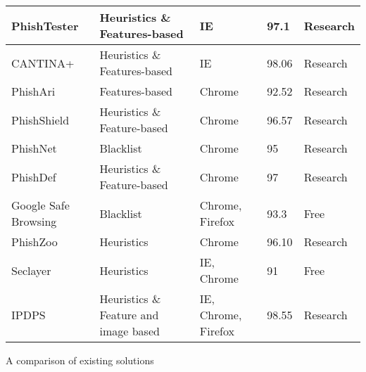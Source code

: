 \begin{singlespace}
\begin{center}
\begin{tabular}{ | m{8em} | m{13em} | m{8.5em} | m{2.3em} | m{5em} | }
            PhishTester                  & Heuristics \& Features-based          & IE                  & 97.1            & Research               \\
            \hline
            CANTINA+                     & Heuristics \& Features-based          & IE                  & 98.06           & Research               \\
            \hline
            PhishAri                     & Features-based                        & Chrome              & 92.52           & Research               \\
            \hline
            PhishShield                  & Heuristics \& Feature-based           & Chrome              & 96.57           & Research               \\
            \hline
            PhishNet                     & Blacklist                             & Chrome              & 95              & Research               \\
            \hline
            PhishDef                     & Heuristics \& Feature-based           & Chrome              & 97              & Research               \\
            \hline
            Google Safe Browsing         & Blacklist                             & Chrome, Firefox     & 93.3            & Free                   \\
            \hline
            PhishZoo                     & Heuristics                            & Chrome              & 96.10           & Research               \\
            \hline
            Seclayer                     & Heuristics                            & IE, Chrome          & 91              & Free                   \\
            \hline
            IPDPS                        & Heuristics \& Feature and image based & IE, Chrome, Firefox & 98.55           & Research               \\
            \hline
        \end{tabular}
        \captionsetup{type=table}\caption{A comparison of existing solutions \citep{INTELLIGENT_PHISHING_ANFIS}}
    \end{center}
\end{singlespace}